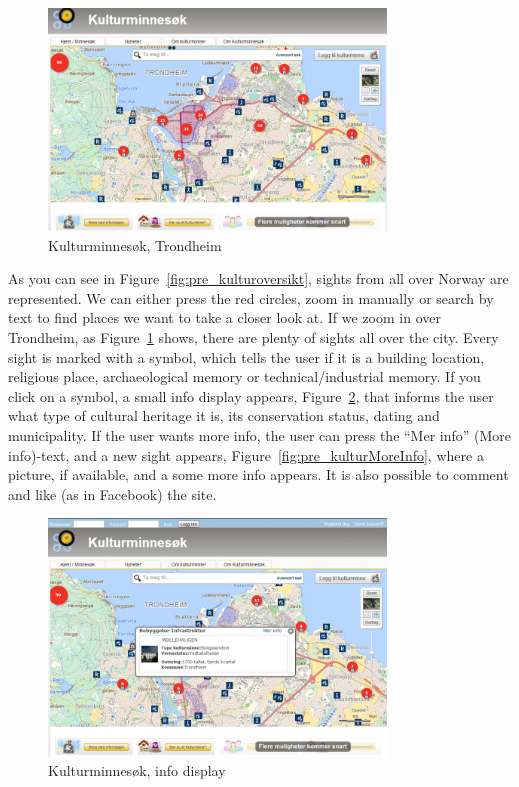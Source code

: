 \documentclass[11pt]{book}
\begin{document}
\begin{figure}[H]
      \centering
      \includegraphics[width=0.8\textwidth]{Figures/Prestudy/kulturminnesokTrondheim.png}
      \caption{Kulturminnesøk, Trondheim}
      \label{fig:pre_kulturTrondheim}
\end{figure}

As you can see in Figure~\ref{fig:pre_kulturoversikt}, sights from all over Norway are represented. We can either press the red circles, zoom in manually or search by text to find places we want to take a closer look at. If we zoom in over Trondheim, as Figure~\ref{fig:pre_kulturTrondheim} shows, there are plenty of sights all over the city. Every sight is marked with a symbol, which tells the user if it is a building location, religious place, archaeological memory or technical/industrial memory. If you click on a symbol, a small info display appears, Figure~\ref{fig:pre_kulturInfo}, that informs the user what type of cultural heritage it is, its conservation status, dating and municipality. If the user wants more info, the user can press the ``Mer info'' (More info)-text, and  a new sight appears, Figure~\ref{fig:pre_kulturMoreInfo}, where a picture, if available, and a some more info appears. It is also possible to comment and like (as in Facebook) the site.

\begin{figure}[H]
      \centering
      \includegraphics[width=0.8\textwidth]{Figures/Prestudy/kulturminnesokClick.png}
      \caption{Kulturminnesøk, info display}
      \label{fig:pre_kulturInfo}
\end{figure}
\end{document}
